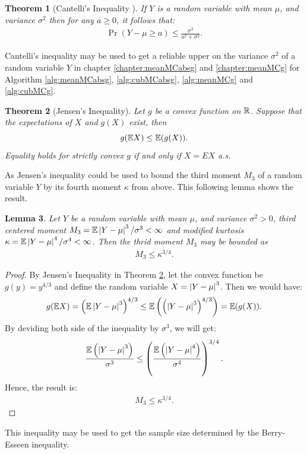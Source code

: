\documentclass{iitthesis}
\newtheorem{theorem}{Theorem}[section]
\newtheorem{lemma}[theorem]{Lemma}
\begin{document}
\begin{theorem}[Cantelli's Inequality {\cite[6.1.e]{LB10}}]\label{CanThm} If $Y$ is a random variable with mean $\mu$, and variance $\sigma^2$ then for any $a \geq 0$, it follows that: 
\begin{align}
\Pr(Y-\mu \ge a) \le  \frac{\sigma^2}{a^2+\sigma^2}.
\end{align}
\end{theorem}
Cantelli's inequality may be used to get a reliable upper on the variance $\sigma^2$ of a random variable $Y$ in chapter \ref{chapter:meanMCabsg} and \ref{chapter:meanMCg} for Algorithm \ref{alg:meanMCabsg}, \ref{alg:cubMCabsg}, \ref{alg:meanMCg} and \ref{alg:cubMCg}.

\begin{theorem}[Jensen's Inequality{\cite[8.4a]{LB10}}]\label{Jensen}
Let $g$ be a convex function on $\mathbb{R}$. Suppose that the expectations of $X$ and $g(X)$ exist, then
$$g(\mathbb{E} X) \leq \mathbb{E}(g(X)).$$
Equality holds for strictly convex $g$ if and only if $X=EX$ a.s.
\end{theorem}
As Jensen's inequality could be used to bound the third moment $M_3$ of a random variable $Y$ by its fourth moment $\kappa$ from above. This following lemma shows the result.
\begin{lemma}\label{M3kappalemma}
Let $Y$ be a random variable with mean $\mu$, and variance $\sigma^2>0$, third centered moment $M_3 = \mathbb{E}\left \lvert Y-\mu \right \rvert^3/\sigma^3 < \infty$ and modified kurtosis $\kappa = \mathbb{E}\left \lvert Y-\mu \right \rvert^4/\sigma^4< \infty$. Then the thrid moment $M_3$ may be bounded as 
\begin{align}\label{M3kappa}
M_3\leq \kappa^{3/4}.
\end{align}
\end{lemma}
\begin{proof}
By Jensen's Inequality in Theorem \ref{Jensen}, let the convex function be $g(y) = y^{4/3}$ and define the random variable $X = \left \lvert Y-\mu \right \rvert^3$. Then we would have:
$$g(\mathbb{E} X) = \left (\mathbb{E}\left \lvert Y-\mu \right \rvert^3\right)^{4/3} \leq \mathbb{E}\left(\left(\left \lvert Y-\mu \right \rvert^3\right)^{4/3}\right) = \mathbb{E}(g(X)).$$
By deviding both side of the inequality by $\sigma^3$, we will get:
$$\frac{\mathbb{E}\left(\left \lvert Y-\mu \right \rvert^3\right)}{\sigma^3} \leq \left (\frac{\mathbb{E}\left(\left \lvert Y-\mu \right \rvert^4\right)}{\sigma^4}\right)^{3/4}.$$
Hence, the result is: 
\begin{align}
M_3\leq \kappa^{3/4}.
\end{align}
\end{proof}
This inequality may be used to get the sample size determined by the Berry-Esseen inequality.
\end{document}
